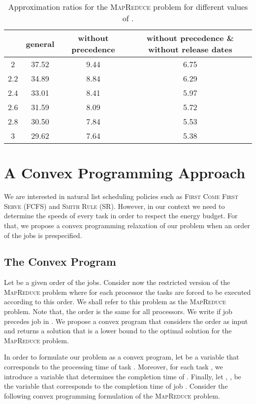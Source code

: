 \documentclass{llncs}
\newcommand{\mr}{\textsc{MapReduce}\xspace}
\newcommand{\mrs}{\textsc{MapReduce}\xspace}
\newcommand{\fcfs}{\textsc{FCFS}\xspace}
\newcommand{\sr}{\textsc{SR}\xspace}
\begin{document}
\begin{table}[htb]
\begin{center}
\begin{tabular}{c||c|c|c}
   & general & without precedence & without precedence \& without release dates \\
  \hline
  \hline
  2   & 37.52 & 9.44 & 6.75 \\
  2.2 & 34.89 & 8.84 & 6.29 \\
  2.4 & 33.01 & 8.41 & 5.97 \\
  2.6 & 31.59 & 8.09 & 5.72 \\
  2.8 & 30.50 & 7.84 & 5.53 \\
  3   & 29.62 & 7.64 & 5.38
\end{tabular}
\end{center}
\caption{Approximation ratios for the \mr problem for different values of .}
\label{tbl:results}
\end{table}

\section{A Convex Programming Approach}\label{se:cp}

We are interested in natural list scheduling policies such as \textsc{First Come First Serve} (\fcfs) and \textsc{Smith Rule} (\sr). However, in our context we need to determine the speeds of every task in order to respect the energy budget. For that, we propose a convex programming relaxation of our problem when an order of the jobs is prespecified.

\subsection{The Convex Program}

Let  be a given order of the jobs.
Consider now the restricted version of the \mr problem where
for each processor  the tasks are forced to be executed according to this order.
We shall refer to this problem as the \mrs problem.
Note that, the order is the same for all processors.
We write  if job  precedes job  in .
We propose a convex program that considers the order  as input and returns a solution that is
a lower bound to the optimal solution for the \mrs problem.

In order to formulate our problem as a convex program, let  be a variable that corresponds to the processing time of task .
Moreover, for each task , we introduce a variable  that determines the completion time of .
Finally, let , , be the variable that corresponds to the completion time of job .
Consider the following convex programming formulation of the \mrs problem.
\end{document}
